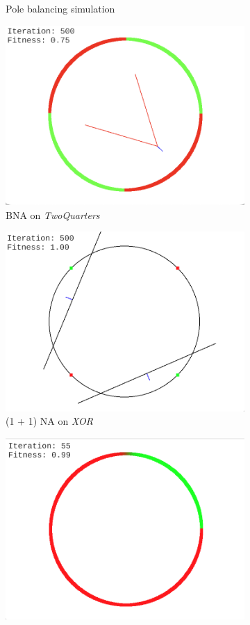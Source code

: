 \begin{figure}
\begin{subfigure}{0.5\textwidth}
        \caption{Pole balancing simulation}
    \end{subfigure}%
    \hfill
    \begin{subfigure}{0.5\textwidth}
        \centering
        \includegraphics[width=0.8\linewidth]{Pictures/bna_gui}
        \caption{BNA on \textit{TwoQuarters}}
    \end{subfigure}%
    \hfill
    \begin{subfigure}{0.5\textwidth}
        \centering
        \includegraphics[width=0.8\linewidth]{Pictures/oneplusonena_xor_gui}
        \caption{(1 + 1) NA on \textit{XOR}}
    \end{subfigure}%
    \hfill
    \begin{subfigure}{0.5\textwidth}
        \centering
        \includegraphics[width=0.8\linewidth]{Pictures/neat_sphere_gui}

\end{subfigure}
\end{figure}
